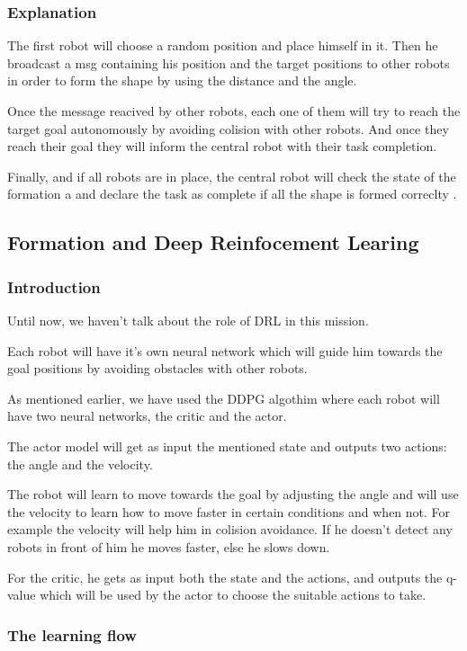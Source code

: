 \documentclass[12pt]{extarticle}
\begin{document}
\subsubsection{Explanation}

The first robot will choose a random position and place himself in it. Then he broadcast a msg containing his position and the target positions to other robots in order to form the shape by using the distance and the angle.

Once the message reacived by other robots, each one of them will try to reach the target goal autonomously by avoiding colision with other robots.
And once they reach their goal they will inform the central robot with their task completion.

Finally, and if all robots are in place, the central robot will check  the state of the formation a and declare the task  as complete if all the shape is formed correclty .




\subsection{Formation and Deep Reinfocement Learing}
\subsubsection{Introduction}
Until now, we haven't talk about the role of DRL in this mission.

Each robot will have it's own neural network which will guide him towards the goal positions by avoiding obstacles with other robots.

As  mentioned earlier, we have used the DDPG algothim where each robot will have two neural networks, the critic and the actor.

The actor model will get as input the mentioned state and outputs two actions: the angle and the velocity.

The robot will learn to  move towards the goal by adjusting the angle and will use the velocity to learn how to move faster in certain conditions and when not. For example the velocity will
help him in colision avoidance. If he doesn't detect any robots in front of him  he moves faster, else he slows down.


For the critic, he gets as input both the state and the actions, and outputs the q-value which will be used by the actor to choose the suitable actions to take.
\subsubsection{The learning flow}
\end{document}
